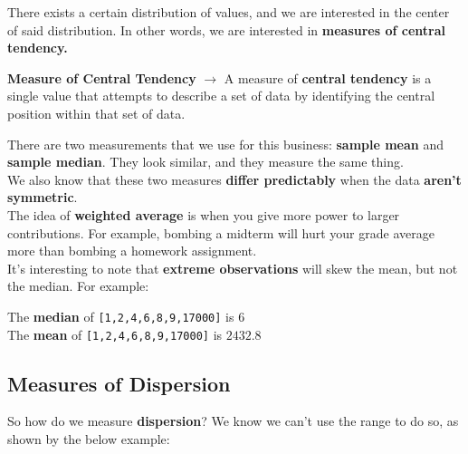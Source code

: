 \documentclass[english, 10pt]{article}
\begin{document}
There exists a certain distribution of values, and we are interested in the center of said distribution. In other words, we are interested in \textbf{measures of central tendency.}\\

\begin{tcolorbox}[title=Definition:,colframe=red!75!black,colback=red!5!white,arc=0pt,fonttitle=\bfseries]
\textbf{Measure of Central Tendency} $\rightarrow$ A measure of \textbf{central tendency} is a single value that attempts to describe a set of data by identifying the central position within that set of data.
\end{tcolorbox}

\hfill \break There are two measurements that we use for this business: \textbf{sample mean} and \textbf{sample median}. They look similar, and they measure the same thing.\\

We also know that these two measures \textbf{differ predictably} when the data \textbf{aren't symmetric}.\\

The idea of \textbf{weighted average} is when you give more power to larger contributions. For example, bombing a midterm will hurt your grade average more than bombing a homework assignment.\\

\hfill \break It's interesting to note that \textbf{extreme observations} will skew the mean, but not the median. For example:\\

\begin{myproof}
The \textbf{median} of \texttt{[1,2,4,6,8,9,17000]} is $6$\\
The \textbf{mean} of \texttt{[1,2,4,6,8,9,17000]} is $2432.8$ 
\end{myproof} 

\subsection{Measures of Dispersion}

\hfill \break So how do we measure \textbf{dispersion}? We know we can't use the range to do so, as shown by the below example:\\
\end{document}
